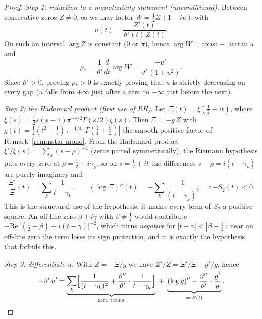 \documentclass[11pt]{article}
\theoremstyle{definition}
\begin{document}
\begin{proof}
\emph{Step 1: reduction to a monotonicity statement (unconditional).}
Between consecutive zeros $Z\neq0$, so we may factor
$W=\tfrac12Z\,(1-iu)$ with
\[
u(t)=\frac{Z'(t)}{\vartheta'(t)\,Z(t)} .
\]
On such an interval $\arg Z$ is constant ($0$ or $\pi$), hence
$\arg W=\mathrm{const}-\arctan u$ and
\[
\rho_{\ast}=\frac{1}{\vartheta'}\frac{d}{dt}\arg W
=\frac{-u'}{\vartheta'\,(1+u^{2})} .
\]
Since $\vartheta'>0$, proving $\rho_{\ast}>0$ is exactly proving that $u$ is
strictly decreasing on every gap ($u$ falls from $+\infty$ just after a zero
to $-\infty$ just before the next).

\emph{Step 2: the Hadamard product (first use of RH).}
Let $\Xi(t)=\xi(\tfrac12+it)$, where
$\xi(s)=\tfrac12s(s-1)\pi^{-s/2}\Gamma(s/2)\zeta(s)$. Then $\Xi=-g\,Z$ with
$g(t)=\tfrac12(t^{2}+\tfrac14)\,\pi^{-1/4}\,
|\Gamma(\tfrac14+\tfrac{it}{2})|$ the smooth positive factor of
Remark~\ref{rem:nstar-mono}. From the Hadamard
product $\xi'/\xi(s)=\sum_{\rho}(s-\rho)^{-1}$ (zeros paired symmetrically),
the Riemann hypothesis puts every zero at $\rho=\tfrac12+i\gamma_k$, so on
$s=\tfrac12+it$ the differences $s-\rho=i(t-\gamma_k)$ are purely imaginary
and
\[
\frac{\Xi'}{\Xi}(t)=\sum_k\frac{1}{t-\gamma_k},
\qquad
(\log\Xi)''(t)=-\sum_k\frac{1}{(t-\gamma_k)^{2}}=:-S_2(t)<0 .
\]
This is the structural use of the hypothesis: it makes every term of $S_2$ a
positive square. An off-line zero $\beta+i\gamma$ with $\beta\neq\tfrac12$
would contribute
$-\mathrm{Re}\,\bigl[(\tfrac12-\beta)+i(t-\gamma)\bigr]^{-2}$, which turns
\emph{negative} for $|t-\gamma|<|\beta-\tfrac12|$: near an off-line zero the
term loses its sign protection, and it is exactly the hypothesis that
forbids this.

\emph{Step 3: differentiate $u$.}
With $Z=-\Xi/g$ we have $Z'/Z=\Xi'/\Xi-g'/g$, hence
\[
-\vartheta'\,u'
=\underbrace{\sum_k\Bigl[\frac{1}{(t-\gamma_k)^{2}}
+\frac{\vartheta''}{\vartheta'}\cdot\frac{1}{t-\gamma_k}\Bigr]}_{\text{zero
terms}}
\;+\;
\underbrace{(\log g)''-\frac{\vartheta''}{\vartheta'}\cdot\frac{g'}{g}}_{=:E(t)} .
\]


\end{proof}
\end{document}

